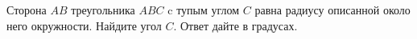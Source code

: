 \begin{ex}
	\begin{condition}
		 Сторона \( AB  \) треугольника \( ABC  \) c тупым углом \( C  \) равна радиусу описанной около него окружности. Найдите угол \( C \). Ответ дайте в градусах.
	\end{condition}
\end{ex}